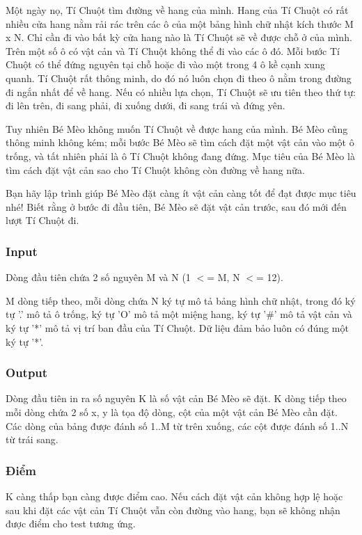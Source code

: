 

Một ngày nọ, Tí Chuột tìm đường về hang của mình. Hang của Tí Chuột có rất nhiều cửa hang nằm rải rác trên các ô của một bảng hình chữ nhật kích thước M x N. Chỉ cần đi vào bất kỳ cửa hang nào là Tí Chuột sẽ về được chỗ ở của mình. Trên một số ô có vật cản và Tí Chuột không thể đi vào các ô đó. Mỗi bước Tí Chuột có thể đứng nguyên tại chỗ hoặc đi vào một trong 4 ô kề cạnh xung quanh. Tí Chuột rất thông minh, do đó nó luôn chọn đi theo ô nằm trong đường đi ngắn nhất để về hang. Nếu có nhiều lựa chọn, Tí Chuột sẽ ưu tiên theo thứ tự: đi lên trên, đi sang phải, đi xuống dưới, đi sang trái và đứng yên.

Tuy nhiên Bé Mèo không muốn Tí Chuột về được hang của mình. Bé Mèo cũng thông minh không kém; mỗi bước Bé Mèo sẽ tìm cách đặt một vật cản vào một ô trống, và tất nhiên phải là ô Tí Chuột không đang đứng. Mục tiêu của Bé Mèo là tìm cách đặt vật cản sao cho Tí Chuột không còn đường về hang nữa.

Bạn hãy lập trình giúp Bé Mèo đặt càng ít vật cản càng tốt để đạt được mục tiêu nhé! Biết rằng ở bước đi đầu tiên, Bé Mèo sẽ đặt vật cản trước, sau đó mới đến lượt Tí Chuột đi.

\subsubsection{Input}

Dòng đầu tiên chứa 2 số nguyên M và N (1 $<$= M, N $<$= 12).

M dòng tiếp theo, mỗi dòng chứa N ký tự mô tả bảng hình chữ nhật, trong đó ký tự '.' mô tả ô trống, ký tự 'O' mô tả một miệng hang, ký tự '\#' mô tả vật cản và ký tự '*' mô tả vị trí ban đầu của Tí Chuột. Dữ liệu đảm bảo luôn có đúng một ký tự '*'.

\subsubsection{Output}

Dòng đầu tiên in ra số nguyên K là số vật cản Bé Mèo sẽ đặt. K dòng tiếp theo mỗi dòng chứa 2 số x, y là tọa độ dòng, cột của một vật cản Bé Mèo cần đặt. Các dòng của bảng được đánh số 1..M từ trên xuống, các cột được đánh số 1..N từ trái sang.

\subsubsection{Điểm}

K càng thấp bạn càng được điểm cao. Nếu cách đặt vật cản không hợp lệ hoặc sau khi đặt các vật cản Tí Chuột vẫn còn đường vào hang, bạn sẽ không nhận được điểm cho test tương ứng.

